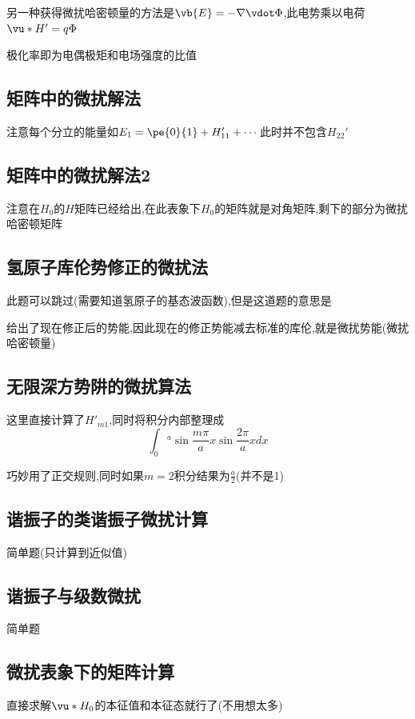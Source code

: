             另一种获得微扰哈密顿量的方法是$ \vb{E} = - \nabla \vdot \Phi $,此电势乘以电荷$ \vu*{H}' = q \Phi  $

            极化率即为电偶极矩和电场强度的比值

        \subsection{矩阵中的微扰解法}
            注意每个分立的能量如$E_1 = \pe{0}{1} + H_{11}' + \cdots$此时并不包含$H_{22}'$

        \subsection{矩阵中的微扰解法2}
            注意在$H_{0}$的$H$矩阵已经给出,在此表象下$H_{0}$的矩阵就是对角矩阵,剩下的部分为微扰哈密顿矩阵

        \subsection{氢原子库伦势修正的微扰法}
            此题可以跳过(需要知道氢原子的基态波函数),但是这道题的意思是

            给出了现在修正后的势能,因此现在的修正势能减去标准的库伦,就是微扰势能(微扰哈密顿量)
        
        \subsection{无限深方势阱的微扰算法}
            这里直接计算了$H'_{m1}$,同时将积分内部整理成
            $$ \int_{0}{^a} \sin{\frac{m \pi }{a} x} \sin{\frac{2\pi}{a}x} dx $$
            
            巧妙用了正交规则,同时如果$m=2$积分结果为$ \frac{a}{2} $(并不是1)

        \subsection{谐振子的类谐振子微扰计算}
            简单题(只计算到近似值)

        \subsection{谐振子与级数微扰}
            简单题

        \subsection{微扰表象下的矩阵计算}
            直接求解$\vu*{H}_{0}$的本征值和本征态就行了(不用想太多)

